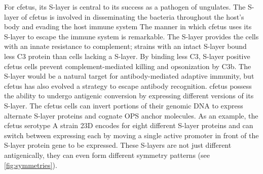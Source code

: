   For \acl{cfetus}, its \ac{S-layer} is central to its success as a pathogen of ungulates. The \ac{S-layer} of \ac{cfetus} is involved in disseminating the bacteria throughout the
host's body and evading the host immune system The manner in which \ac{cfetus} uses its \ac{S-layer} to escape the immune system is remarkable.
The \ac{S-layer} provides the cells with an innate resistance to complement; strains with an intact \ac{S-layer} bound less C3 protein than cells lacking a \ac{S-layer}. By binding
less C3, \ac{S-layer} positive \ac{cfetus} cells prevent complement-mediated killing and opsonization by C3b. The \ac{S-layer} would be a natural target for antibody-mediated
adaptive immunity, but \ac{cfetus} has also evolved a strategy to escape antibody recognition. \ac{cfetus} possess the ability to undergo antigenic conversion by expressing
different versions of its \ac{S-layer}. The \ac{cfetus} cells can invert portions of their genomic DNA to express alternate \ac{S-layer} proteins and cognate \ac{OPS} anchor
molecules. As an example, the \ac{cfetus} serotype A strain 23D encodes for eight different \ac{S-layer} proteins and can switch between expressing each by moving a single active
promoter in front of the \ac{S-layer} protein gene to be expressed. These \acp{S-layer} are not just different antigenically, they can even form different symmetry patterns (see
\cref{fig:symmetries}).

